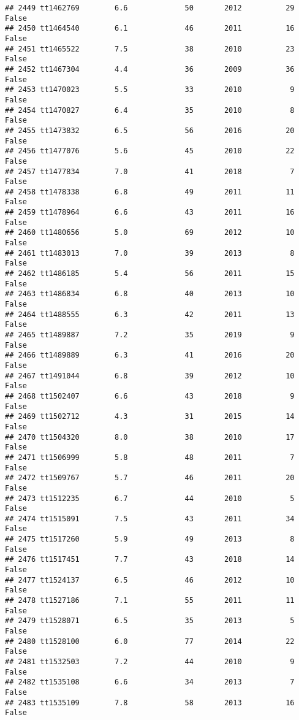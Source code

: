 \documentclass[
]{article}
\begin{document}
\begin{verbatim}
## 2449 tt1462769        6.6             50       2012          29   False
## 2450 tt1464540        6.1             46       2011          16   False
## 2451 tt1465522        7.5             38       2010          23   False
## 2452 tt1467304        4.4             36       2009          36   False
## 2453 tt1470023        5.5             33       2010           9   False
## 2454 tt1470827        6.4             35       2010           8   False
## 2455 tt1473832        6.5             56       2016          20   False
## 2456 tt1477076        5.6             45       2010          22   False
## 2457 tt1477834        7.0             41       2018           7   False
## 2458 tt1478338        6.8             49       2011          11   False
## 2459 tt1478964        6.6             43       2011          16   False
## 2460 tt1480656        5.0             69       2012          10   False
## 2461 tt1483013        7.0             39       2013           8   False
## 2462 tt1486185        5.4             56       2011          15   False
## 2463 tt1486834        6.8             40       2013          10   False
## 2464 tt1488555        6.3             42       2011          13   False
## 2465 tt1489887        7.2             35       2019           9   False
## 2466 tt1489889        6.3             41       2016          20   False
## 2467 tt1491044        6.8             39       2012          10   False
## 2468 tt1502407        6.6             43       2018           9   False
## 2469 tt1502712        4.3             31       2015          14   False
## 2470 tt1504320        8.0             38       2010          17   False
## 2471 tt1506999        5.8             48       2011           7   False
## 2472 tt1509767        5.7             46       2011          20   False
## 2473 tt1512235        6.7             44       2010           5   False
## 2474 tt1515091        7.5             43       2011          34   False
## 2475 tt1517260        5.9             49       2013           8   False
## 2476 tt1517451        7.7             43       2018          14   False
## 2477 tt1524137        6.5             46       2012          10   False
## 2478 tt1527186        7.1             55       2011          11   False
## 2479 tt1528071        6.5             35       2013           5   False
## 2480 tt1528100        6.0             77       2014          22   False
## 2481 tt1532503        7.2             44       2010           9   False
## 2482 tt1535108        6.6             34       2013           7   False
## 2483 tt1535109        7.8             58       2013          16   False

\end{verbatim}
\end{document}
